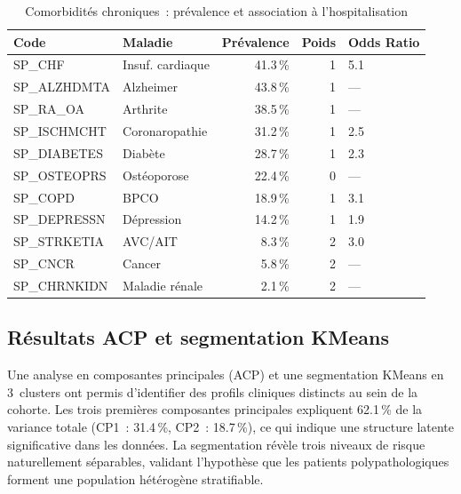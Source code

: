 \begin{table}[htbp]
\centering
\caption{Comorbidités chroniques~: prévalence et association à l'hospitalisation}
\label{tab:comorbidites}
\begin{tabular}{@{}llrrl@{}}
\toprule
\textbf{Code} & \textbf{Maladie} & \textbf{Prévalence} & \textbf{Poids} & \textbf{Odds Ratio} \\
\midrule
SP\_CHF       & Insuf. cardiaque  & 41.3\,\% & 1 & 5.1 \\
SP\_ALZHDMTA  & Alzheimer         & 43.8\,\% & 1 & --- \\
SP\_RA\_OA    & Arthrite          & 38.5\,\% & 1 & --- \\
SP\_ISCHMCHT  & Coronaropathie    & 31.2\,\% & 1 & 2.5 \\
SP\_DIABETES  & Diabète           & 28.7\,\% & 1 & 2.3 \\
SP\_OSTEOPRS  & Ostéoporose       & 22.4\,\% & 0 & --- \\
SP\_COPD      & BPCO              & 18.9\,\% & 1 & 3.1 \\
SP\_DEPRESSN  & Dépression        & 14.2\,\% & 1 & 1.9 \\
SP\_STRKETIA  & AVC/AIT           &  8.3\,\% & 2 & 3.0 \\
SP\_CNCR      & Cancer            &  5.8\,\% & 2 & --- \\
SP\_CHRNKIDN  & Maladie rénale    &  2.1\,\% & 2 & --- \\
\bottomrule
\end{tabular}
\end{table}

\subsection{Résultats ACP et segmentation KMeans}

Une analyse en composantes principales (ACP) et une segmentation KMeans en
3~clusters ont permis d'identifier des profils cliniques distincts au sein de la
cohorte. Les trois premières composantes principales expliquent 62.1\,\% de la
variance totale (CP1~: 31.4\,\%, CP2~: 18.7\,\%), ce qui indique une structure
latente significative dans les données. La segmentation révèle trois niveaux de
risque naturellement séparables, validant l'hypothèse que les patients
polypathologiques forment une population hétérogène stratifiable.

